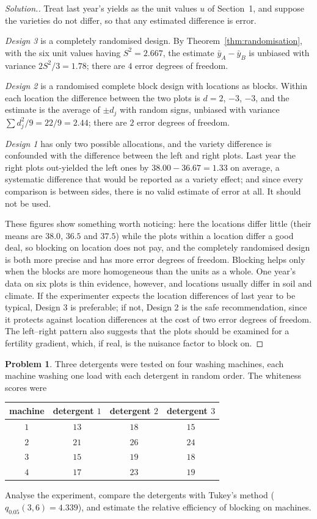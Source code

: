 \documentclass[11pt,a4paper]{article}
\numberwithin{equation}{section}
\theoremstyle{definition}
\newtheorem{problemx}{Problem}[subsection]
\newenvironment{problem}{\begin{problemx}}{\end{problemx}}
\newenvironment{solution}
  {\renewcommand{\qedsymbol}{}\begin{proof}[\textit{Solution}.]}
  {\end{proof}}
\begin{document}
\begin{solution}
Treat last year's yields as the unit values $u$ of Section~1, and suppose the varieties do not differ, so that any estimated difference is error.

\emph{Design 3} is a completely randomised design. By Theorem~\ref{thm:randomisation}, with the six unit values having $S^2 = 2.667$, the estimate $\bar y_A - \bar y_B$ is
unbiased with variance $2S^2/3 = 1.78$; there are $4$ error degrees of freedom.

\emph{Design 2} is a randomised complete block design with locations as blocks. Within each location the difference between the two plots is
$d = 2$, $-3$, $-3$, and the estimate is the average of $\pm d_j$ with random signs, unbiased with variance $\sum d_j^2/9 = 22/9 = 2.44$; there are $2$ error degrees of
freedom.

\emph{Design 1} has only two possible allocations, and the variety difference is confounded with the difference between the left and right plots.
Last year the right plots out-yielded the left ones by $38.00 - 36.67 = 1.33$ on average, a systematic difference that would be reported as a
variety effect; and since every comparison is between sides, there is no valid estimate of error at all. It should not be used.

These figures show something worth noticing: here the locations differ little (their means are $38.0$, $36.5$ and $37.5$) while the plots within a
location differ a good deal, so blocking on location does not pay, and the completely randomised design is both more precise and has more
error degrees of freedom. Blocking helps only when the blocks are more homogeneous than the units as a whole. One year's data on six plots is
thin evidence, however, and locations usually differ in soil and climate. If the experimenter expects the location differences of last year to be
typical, Design 3 is preferable; if not, Design 2 is the safe recommendation, since it protects against location differences at the cost of two
error degrees of freedom. The left--right pattern also suggests that the plots should be examined for a fertility gradient, which, if real, is the
nuisance factor to block on.
\end{solution}

\begin{problem}
Three detergents were tested on four washing machines, each machine washing one load with each detergent in random order. The whiteness
scores were
\begin{center}
\begin{tabular}{c|ccc}
machine & detergent $1$ & detergent $2$ & detergent $3$ \\
\hline
$1$ & $13$ & $18$ & $15$ \\
$2$ & $21$ & $26$ & $24$ \\
$3$ & $15$ & $19$ & $18$ \\
$4$ & $17$ & $23$ & $19$
\end{tabular}
\end{center}
Analyse the experiment, compare the detergents with Tukey's method ($q_{0.05}(3, 6) = 4.339$), and estimate the relative efficiency of blocking on
machines.
\end{problem}
\end{document}
